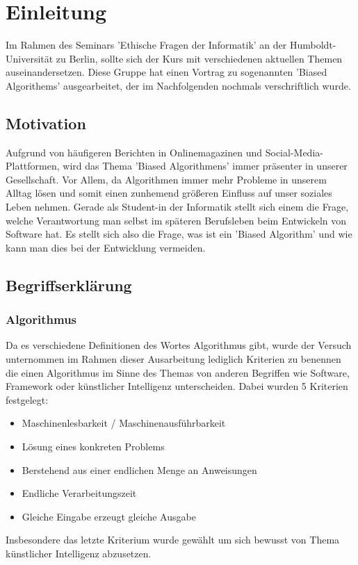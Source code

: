 \chapter{Einleitung}

Im Rahmen des Seminars 'Ethische Fragen der Informatik' an der Humboldt-Universität zu Berlin, sollte sich der Kurs mit verschiedenen aktuellen Themen auseinandersetzen. Diese Gruppe hat einen Vortrag zu sogenannten 'Biased Algorithems' ausgearbeitet, der im Nachfolgenden nochmals verschriftlich wurde.

\section{Motivation}

Aufgrund von häufigeren Berichten in Onlinemagazinen und Social-Media-Plattformen, wird das Thema 'Biased Algorithmens' immer präsenter in unserer Gesellschaft. Vor Allem, da Algorithmen immer mehr Probleme in unserem Alltag lösen und somit einen zunhemend größeren Einfluss auf unser soziales Leben nehmen.
Gerade als Student-in der Informatik stellt sich einem die Frage, welche Verantwortung man selbst im späteren Berufsleben beim Entwickeln von Software hat. Es stellt sich also die Frage, was ist ein 'Biased Algorithm' und wie kann man dies bei der Entwicklung vermeiden.



\section{Begriffserklärung}


\subsection{Algorithmus}
Da es verschiedene Definitionen des Wortes Algorithmus gibt, wurde der Versuch unternommen im Rahmen dieser Ausarbeitung lediglich Kriterien zu benennen die einen Algorithmus im Sinne des Themas von anderen Begriffen wie Software, Framework oder künstlicher Intelligenz unterscheiden. Dabei wurden 5 Kriterien festgelegt:
\begin{itemize}
	\item Maschinenlesbarkeit / Maschinenausführbarkeit
	\item Lösung eines konkreten Problems
	\item Berstehend aus einer endlichen Menge an Anweisungen
	\item Endliche Verarbeitungszeit
	\item Gleiche Eingabe erzeugt gleiche Ausgabe
\end{itemize}
Insbesondere das letzte Kriterium wurde gewählt um sich bewusst von Thema künstlicher Intelligenz abzusetzen.

